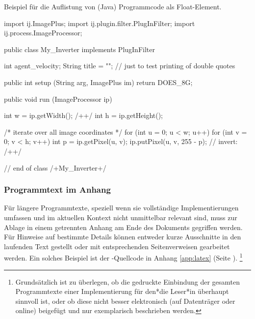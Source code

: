 \begin{program}
\caption{Beispiel für die Auflistung von (Java) Programmcode als Float-Element.}
\label{prog:CodeExample}
\begin{JavaCode}
import ij.ImagePlus;
import ij.plugin.filter.PlugInFilter;
import ij.process.ImageProcessor;

public class My_Inverter implements PlugInFilter {
	int agent_velocity;
	String title = ""; 				// just to test printing of double quotes

	public int setup (String arg, ImagePlus im) {
		return DOES_8G;
	}

	public void run (ImageProcessor ip) {
		int w = ip.getWidth(); /+\label{ExampleCodeLabel}+/
		int h = ip.getHeight();

		/* iterate over all image coordinates */
		for (int u = 0; u < w; u++) {
			for (int v = 0; v < h; v++) {
				int p = ip.getPixel(u, v);
				ip.putPixel(u, v, 255 - p); // invert: /+\label{MathInCode}+/
			}
		}
	}
} // end of class /+My\_Inverter+/
\end{JavaCode}
%
\end{program}


\subsubsection{Programmtext im Anhang}

Für längere Programmtexte, speziell wenn sie vollständige Implementierungen
umfassen und im aktuellen Kontext nicht unmittelbar relevant sind, muss zur
Ablage in einem getrennten Anhang am Ende des Dokuments gegriffen werden. Für
Hinweise auf bestimmte Details können entweder kurze Ausschnitte in den
laufenden Text gestellt oder mit entsprechenden Seitenverweisen gearbeitet
werden. Ein solches Beispiel ist der \latex-Quellcode in Anhang
\ref{app:latex} (Seite \pageref{app:latex}).%
\footnote{Grundsätzlich ist zu überlegen, ob die gedruckte Einbindung der
gesamten Programmtexte einer Implementierung für den*die Leser*in überhaupt
sinnvoll ist, oder ob diese nicht besser elektronisch (auf Datenträger oder online)
beigefügt und nur exemplarisch beschrieben werden.}
